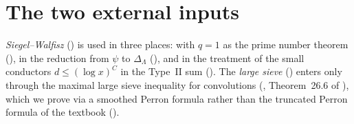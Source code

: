 \section{The two external inputs}
\emph{Siegel--Walfisz} () is used in three places: with $q = 1$ as the prime
number theorem (), in the reduction from $\psi$ to $\Delta_\Lambda$
(), and in the treatment of the small conductors $d \le (\log x)^C$ in the
Type~II sum (). The \emph{large sieve} () enters only
through the maximal large sieve inequality for convolutions (,
Theorem~26.6 of \cite{Koukoulopoulos2019}), which we prove via a smoothed Perron formula rather than
the truncated Perron formula of the textbook ().

